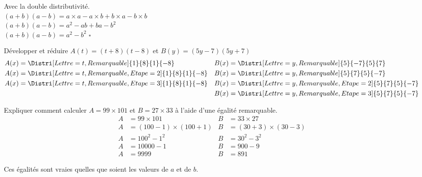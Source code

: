 \begin{preuve}
    Avec la double distributivité.\\
    $(a+b)(a-b)=a\times a-a\times b+b\times a -b\times b$\\
    $(a+b)(a-b)=a^2-ab+ba-b^2$\\
    $(a+b)(a-b)=a^2-b^2$ $\square$
\end{preuve}

\begin{exemples*1}
    Développer et réduire  $A(t)=(t+8)(t-8)$ et $B(y)=(5y-7)(5y+7)$
    \correction
    \begin{align*}
        A(x)&=\Distri[Lettre=t,Remarquable]{1}{8}{1}{-8}        &B(x)&=\Distri[Lettre=y,Remarquable]{5}{-7}{5}{7}\\
        A(x)&=\Distri[Lettre=t,Remarquable,Etape=2]{1}{8}{1}{-8}&B(x)&=\Distri[Lettre=y,Remarquable]{5}{7}{5}{-7}\\
        A(x)&=\Distri[Lettre=t,Remarquable,Etape=3]{1}{8}{1}{-8}&B(x)&=\Distri[Lettre=y,Remarquable,Etape=2]{5}{7}{5}{-7}\\
            &                                                   &B(x)&=\Distri[Lettre=y,Remarquable,Etape=3]{5}{7}{5}{-7} 
    \end{align*}
\end{exemples*1}

\begin{exemples*1}
    Expliquer comment calculer $A=99\times 101$ et $B=27\times 33$ à l'aide d'une égalité remarquable.
    \correction
    \begin{align*}
        A&=99\times 101 &B&=33\times 27\\
        A&=(100-1)\times (100+1) &B&=(30+3)\times (30-3)\\
        A&= 100^2-1^2&B&=30^2-3^2\\
        A&= \num{10000}-1&B&=900-9\\
        A&= \num{9999}&B&=891
    \end{align*}
\end{exemples*1}

\begin{remarque}
    Ces égalités sont vraies quelles que soient les valeurs de $a$ et de $b$.
\end{remarque}
